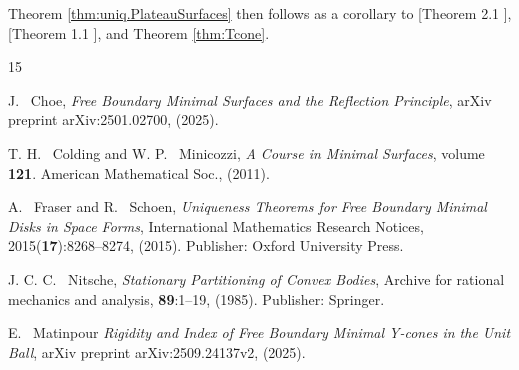 \documentclass[11pt]{amsart}
\numberwithin{equation}{section}
\theoremstyle{theorem}
\theoremstyle{definition}
\numberwithin{equation}{section}
\begin{document}
Theorem \ref{thm:uniq.PlateauSurfaces} then follows as a corollary to [Theorem 2.1 \cite{fraser2015uniqueness}], [Theorem 1.1 \cite{matinpour2025cone}], and  Theorem \ref{thm:Tcone}.

\begin{thebibliography}{15}

J. ~Choe, 
\emph{Free Boundary Minimal Surfaces and the Reflection Principle},
arXiv preprint arXiv:2501.02700, (2025).

T. H. ~Colding  and W. P. ~Minicozzi,
\emph{A Course in Minimal Surfaces}, volume \textbf{121}.
American Mathematical Soc., (2011).


A. ~Fraser and R. ~Schoen, 
\emph{Uniqueness Theorems for Free Boundary Minimal Disks in
Space Forms}, International Mathematics Research Notices, 2015(\textbf{17}):8268--8274, (2015).
Publisher: Oxford University Press.


J. C. C. ~Nitsche, 
\emph{Stationary Partitioning of Convex Bodies},
Archive for rational mechanics and analysis, \textbf{89}:1--19, (1985).
Publisher: Springer.

E. ~Matinpour
 \emph{Rigidity and Index of Free Boundary Minimal Y-cones in the Unit Ball},
arXiv preprint
arXiv:2509.24137v2, (2025).




\end{thebibliography}
\end{document}

